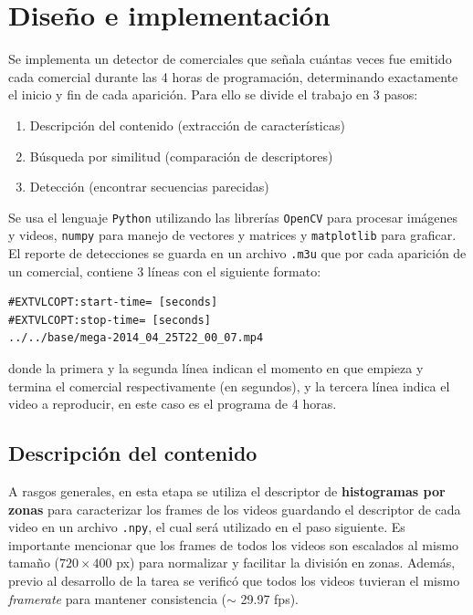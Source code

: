 \documentclass[14pt,letterpaper,hidelinks]{extarticle}
\begin{document}
\section{Diseño e implementación}
Se implementa un detector de comerciales que señala cuántas veces fue emitido cada comercial durante las 4 horas de programación, determinando exactamente el inicio y
fin de cada aparición. Para ello se divide el trabajo en 3 pasos: 
\begin{enumerate}
\item Descripción del contenido (extracción de características)
\item Búsqueda por similitud (comparación de descriptores)
\item Detección (encontrar secuencias parecidas)
\end{enumerate}

Se usa el lenguaje \verb+Python+ utilizando las librerías \verb+OpenCV+ para procesar imágenes y videos, \verb+numpy+ para manejo de vectores y matrices y \verb+matplotlib+ para graficar.\\

El reporte de detecciones se guarda en un archivo \verb+.m3u+ que por cada aparición de un comercial, contiene 3 líneas con el siguiente formato: 
\begin{verbatim}
#EXTVLCOPT:start-time= [seconds]
#EXTVLCOPT:stop-time= [seconds]
../../base/mega-2014_04_25T22_00_07.mp4
\end{verbatim}
donde la primera y la segunda línea indican el momento en que empieza y termina el comercial respectivamente (en segundos), y la tercera línea indica el video a reproducir, en este caso es el programa de 4 horas.\\

\subsection{Descripción del contenido}
A rasgos generales, en esta etapa se utiliza el descriptor de \textbf{histogramas por zonas} para caracterizar los frames de los videos guardando el descriptor de cada video en un archivo \verb+.npy+, el cual será utilizado en el paso siguiente. Es importante mencionar que los frames de todos los videos son escalados al mismo tamaño ($720\times400$ px) para normalizar y facilitar la división en zonas. Además, previo al desarrollo de la tarea se verificó que todos los videos tuvieran el mismo \textit{framerate} para mantener consistencia ($\sim$ 29.97 fps).\\
\end{document}
